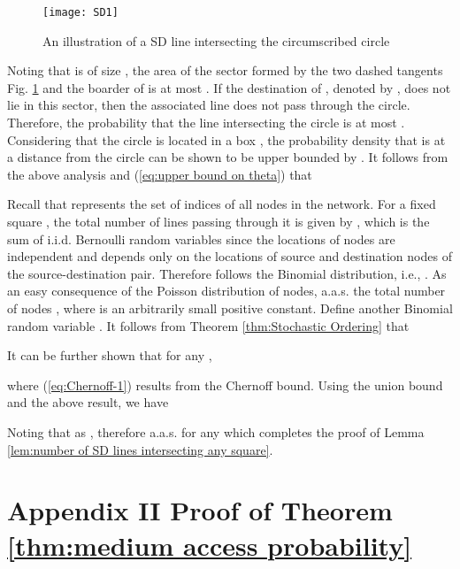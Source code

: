 \documentclass[english]{IEEEtran}
\theoremstyle{plain}
\theoremstyle{plain}
\theoremstyle{plain}
\theoremstyle{remark}
\begin{document}
\begin{figure}
\begin{centering}
\texttt{[image: SD1]}
\par\end{centering}

\protect\caption{\label{fig:SD_1}An illustration of a SD line intersecting the circumscribed
circle}
\end{figure}


Noting that  is of size , the area
of the sector formed by the two dashed tangents Fig. \ref{fig:SD_1}
and the boarder of  is at most .
If the destination of , denoted by , does not lie in this
sector, then the associated  line does not pass through the circle.
Therefore, the probability that the  line intersecting the circle
is at most . Considering that
the circle is located in a  box ,
the probability density that  is at a distance  from the circle
can be shown to be upper bounded by . It follows
from the above analysis and (\ref{eq:upper bound on theta}) that

 

Recall that  represents the set of indices of all nodes in
the network. For a fixed square , the total number of  lines
passing through it is given by ,
which is the sum of i.i.d. Bernoulli random variables since the locations
of nodes are independent and  depends only on the locations
of source and destination nodes of the  source-destination
pair. Therefore  follows the Binomial distribution, i.e.,
.
As an easy consequence of the Poisson distribution of nodes, a.a.s.
the total number of nodes ,
where  is an arbitrarily small positive constant. Define
another Binomial random variable 
. It follows from Theorem \ref{thm:Stochastic Ordering} that

It can be further shown that for any ,

where (\ref{eq:Chernoff-1}) results from the Chernoff bound. Using
the union bound and the above result, we have

Noting that 
as , therefore a.a.s. 
for any  which completes
the proof of Lemma \ref{lem:number of SD lines intersecting any square}.


\section*{Appendix II Proof of Theorem \ref{thm:medium access probability}}
\end{document}
